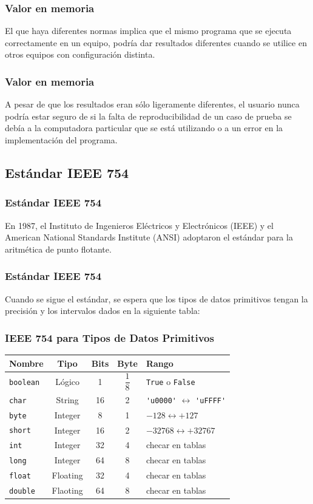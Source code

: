 \begin{frame}
\frametitle{Valor en memoria}
El que haya diferentes normas implica que el mismo programa que se ejecuta correctamente en un equipo, podría dar resultados diferentes cuando se utilice en otros equipos con configuración distinta.
\end{frame}
\begin{frame}
\frametitle{Valor en memoria}
A pesar de que los resultados eran sólo ligeramente diferentes, el usuario nunca podría estar seguro de si la falta de reproducibilidad de un caso de prueba se debía a la computadora particular que se está utilizando o a un error en la implementación del programa.
\end{frame}
\subsection{Estándar IEEE 754}
\begin{frame}
\frametitle{Estándar IEEE 754}
En 1987, el Instituto de Ingenieros Eléctricos y Electrónicos (IEEE) y el American National Standards Institute (ANSI) adoptaron el estándar  para la aritmética de punto flotante.
\end{frame}
\begin{frame}
\frametitle{Estándar IEEE 754}
Cuando se sigue el estándar, se espera que los tipos de datos primitivos tengan la precisión y los intervalos dados en la siguiente tabla:
\end{frame}
\begin{frame}[fragile]
\frametitle{IEEE 754 para Tipos de Datos Primitivos}
\begin{table}
\fontsize{10}{10}\selectfont
\begin{tabular}{l c c c l}
\hline
Nombre & Tipo & Bits & Byte & Rango \\ \hline
\texttt{boolean} & Lógico & 1 & $\dfrac{1}{8}$ & \texttt{True} o \texttt{False} \\ \hline
\texttt{char} & String & 16 & 2 & \verb|'u0000'| $\longleftrightarrow$ \verb|'uFFFF'| \\ \hline
\texttt{byte} & Integer & 8 & 1 & $-128 \longleftrightarrow +127$ \\ \hline
\texttt{short} & Integer & 16 & 2 & $-32768 \longleftrightarrow +32767$ \\ \hline
\texttt{int} & Integer & 32 & 4 & checar en tablas \\ \hline
\texttt{long} & Integer & 64 & 8 & checar en tablas \\ \hline
\texttt{float} & Floating & 32 & 4 & checar en tablas \\ \hline
\texttt{double} & Flaoting & 64 & 8 & checar en tablas \\ \hline
\end{tabular}
\end{table}
\end{frame}
